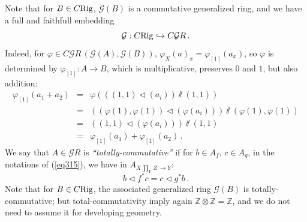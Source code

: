 \documentclass[leqno]{article}
\numberwithin{equation}{section}
\begin{document}
Note that for $B \in C{\rm Rig}$, ${\mathcal G} (B)$ is a commutative generalized ring, and we have a full and faithfull embedding
\begin{equation}
\label{eq316}
{\mathcal G} : C{\rm Rig} \hookrightarrow C{\mathcal G} R \, .
\end{equation}
Indeed, for $\varphi \in C{\mathcal G} R \, ({\mathcal G} (A) , {\mathcal G}(B))$, $\varphi_X (a)_x = \varphi_{[1]} (a_x)$, so $\varphi$ is determined by $\varphi_{[1]} : A \to B$, which is multiplicative, preserves $0$ and $1$, but also addition:
\begin{eqnarray}
\label{eq317}
\varphi_{[1]} (a_1 + a_2) &= &\varphi \left( ((1,1) \lhd (a_i)) \sslash (1,1) \right) \\
&= &((\varphi (1) , \varphi (1)) \lhd (\varphi (a_i))) \sslash (\varphi (1) , \varphi (1)) \nonumber \\
&= &((1,1) \lhd (\varphi (a_i))) \sslash (1,1) \nonumber \\
&= &\varphi_{[1]} (a_1) + \varphi_{[1]} (a_2) \, . \nonumber
\end{eqnarray}
We say that $A \in {\mathcal G} R$ is {\it ``totally-commutative''} if for $b \in A_f$, $c \in A_g$, in the notations of (\ref{eq315}), we have in $A_{X \, \underset{Y}{\prod} \, Z \, \to Y}$:
\begin{equation}
\label{eq318}
b \lhd f^* c = c \lhd g^* b \, .
\end{equation}
Note that for $B \in C{\rm Rig}$, the associated generalized ring ${\mathcal G} (B)$ is totally-commutative; but total-commutativity imply again ${\mathbb Z} \otimes {\mathbb Z} = {\mathbb Z}$, and we do not need to assume it for developing geometry.

\smallskip
\end{document}
